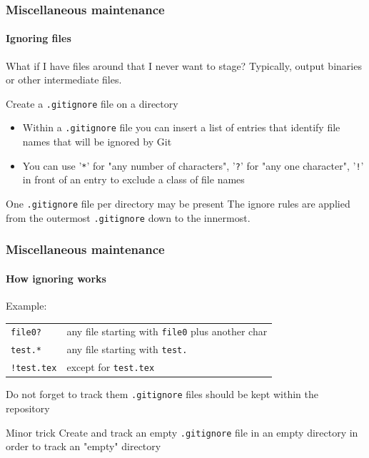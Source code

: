 \begin{frame}
\frametitle{Miscellaneous maintenance}
\framesubtitle{Ignoring files}

\begin{block}{What if I have files around that I never want to stage?}
Typically, output binaries or other intermediate files.
\end{block}
\pause
\begin{block}{Create a \texttt{.gitignore} file on a directory}
\begin{itemize}
\item Within a \texttt{.gitignore} file you can insert a list of entries that identify file names that will be ignored by Git
\item You can use '\texttt{*}' for "any number of characters", '\texttt{?}' for "any one character", '\texttt{!}' in front of an entry to exclude a class of file names
\end{itemize}
\end{block}
\pause
\begin{block}{One \texttt{.gitignore} file per directory may be present}
The ignore rules are applied from the outermost \texttt{.gitignore} down to the innermost.
\end{block}

\end{frame}

\begin{frame}
\frametitle{Miscellaneous maintenance}
\framesubtitle{How ignoring works}

\begin{block}{Example:}
\begin{tabular}{ll}
\texttt{file0?} & any file starting with \texttt{file0} plus another char \\
\texttt{test.*} & any file starting with \texttt{test.}\\
\texttt{!test.tex} & except for \texttt{test.tex} \\
\end{tabular}
\end{block}

\pause
\begin{block}{Do not forget to track them}
\texttt{.gitignore} files should be kept within the repository
\end{block}
\pause
\begin{block}{Minor trick}
Create and track an empty \texttt{.gitignore} file in an empty directory in order to track an "empty" directory
\end{block}
\end{frame}

